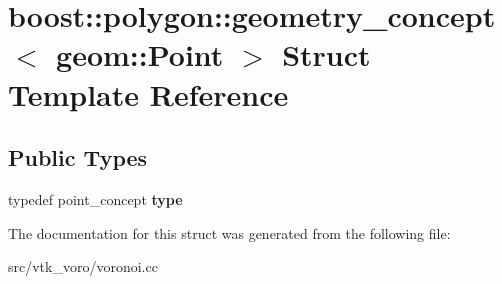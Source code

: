 \hypertarget{structboost_1_1polygon_1_1geometry__concept_3_01geom_1_1Point_01_4}{}\section{boost\+:\+:polygon\+:\+:geometry\+\_\+concept$<$ geom\+:\+:Point $>$ Struct Template Reference}
\label{structboost_1_1polygon_1_1geometry__concept_3_01geom_1_1Point_01_4}
\subsection*{Public Types}
\begin{DoxyCompactItemize}
\item 
typedef point\+\_\+concept {\bfseries type}\hypertarget{structboost_1_1polygon_1_1geometry__concept_3_01geom_1_1Point_01_4_a7b4f3a380bcbc8c1523bc1c30f2d29b1}{}\label{structboost_1_1polygon_1_1geometry__concept_3_01geom_1_1Point_01_4_a7b4f3a380bcbc8c1523bc1c30f2d29b1}

\end{DoxyCompactItemize}


The documentation for this struct was generated from the following file\+:\begin{DoxyCompactItemize}
\item 
src/vtk\+\_\+voro/voronoi.\+cc\end{DoxyCompactItemize}
